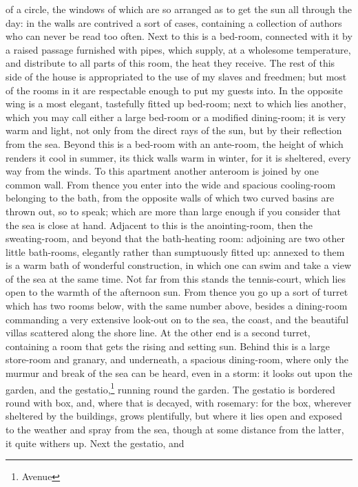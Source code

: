 of a circle, the windows of which are so arranged as to get the sun all
through the day: in the walls are contrived a sort of cases, containing a
collection of authors who can never be read too often. Next to this is a
bed-room, connected with it by a raised passage furnished with pipes,
which supply, at a wholesome temperature, and distribute to all parts of
this room, the heat they receive. The rest of this side of the house is
appropriated to the use of my slaves and freedmen; but most of the rooms
in it are respectable enough to put my guests into. In the opposite wing
is a most elegant, tastefully fitted up bed-room; next to which lies
another, which you may call either a large bed-room or a modified
dining-room; it is very warm and light, not only from the direct rays of
the sun, but by their reflection from the sea. Beyond this is a bed-room
with an ante-room, the height of which renders it cool in summer, its
thick walls warm in winter, for it is sheltered, every way from the winds.
To this apartment another anteroom is joined by one common wall. From
thence you enter into the wide and spacious cooling-room belonging to the
bath, from the opposite walls of which two curved basins are thrown out,
so to speak; which are more than large enough if you consider that the sea
is close at hand. Adjacent to this is the anointing-room, then the
sweating-room, and beyond that the bath-heating room: adjoining are two
other little bath-rooms, elegantly rather than sumptuously fitted up:
annexed to them is a warm bath of wonderful construction, in which one can
swim and take a view of the sea at the same time. Not far from this stands
the tennis-court, which lies open to the warmth of the afternoon sun. From
thence you go up a sort of turret which has two rooms below, with the same
number above, besides a dining-room commanding a very extensive look-out
on to the sea, the coast, and the beautiful villas scattered along the
shore line. At the other end is a second turret, containing a room that
gets the rising and setting sun. Behind this is a large store-room and
granary, and underneath, a spacious dining-room, where only the murmur and
break of the sea can be heard, even in a storm: it looks out upon the
garden, and the gestatio,\footnote{Avenue} running round the garden. The gestatio is
bordered round with box, and, where that is decayed, with rosemary: for
the box, wherever sheltered by the buildings, grows plentifully, but where
it lies open and exposed to the weather and spray from the sea, though at
some distance from the latter, it quite withers up. Next the gestatio, and
